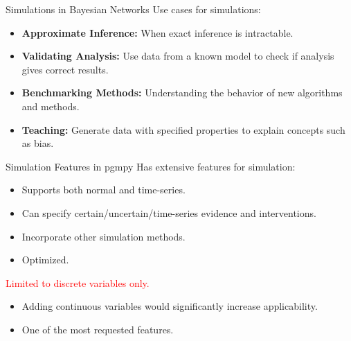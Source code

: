 \documentclass{beamer}
\begin{document}
\begin{frame}{Simulations in Bayesian Networks}
	Use cases for simulations:
	\vspace{2em}
	\begin{itemize}
		\setlength\itemsep{1em}
		\item \textbf{Approximate Inference:} When exact inference is intractable.
		\item \textbf{Validating Analysis:} Use data from a known model to check if analysis gives correct results.
		\item \textbf{Benchmarking Methods:} Understanding the behavior of new algorithms and methods.
		\item \textbf{Teaching:} Generate data with specified properties to explain concepts such as bias.
	\end{itemize}
\end{frame}

\begin{frame}{Simulation Features in pgmpy}
	Has extensive features for simulation:
	\begin{itemize}
		\item Supports both normal and time-series.
		\item Can specify certain/uncertain/time-series evidence and interventions.
		\item Incorporate other simulation methods.
		\item Optimized.
	\end{itemize}


	\vspace{2em}
	\centerline{\textcolor{red}{Limited to discrete variables only.}}
	\vspace{2em}
	\begin{itemize}
		\item Adding continuous variables would significantly increase applicability.
		\item One of the most requested features.
	\end{itemize}



\end{frame}
\end{document}
